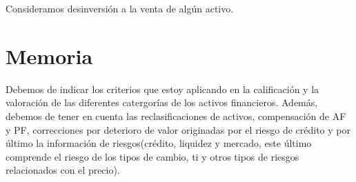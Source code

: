 Consideramos desinversión a la venta de algún activo. 
\newpage
\section{Memoria}

Debemos de indicar los criterios que estoy aplicando en la calificación y la valoración de las diferentes catergorías de los activos financieros. 
Además, debemos de tener en cuenta las reclasificaciones de activos, compensación de AF y PF, correcciones por deterioro de valor originadas por el riesgo de crédito y por último la información de riesgos(crédito, liquidez y mercado, este último comprende el riesgo de los tipos de cambio, ti y otros tipos de riesgos relacionados con el precio).


